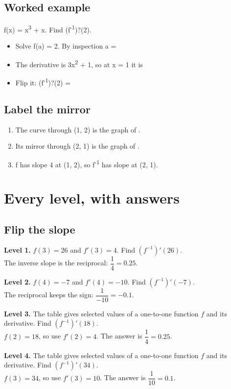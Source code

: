 \documentclass[11pt]{article}
\begin{document}
\subsection*{Worked example}
f(x) = x\textsuperscript{3} + x. Find (f\textsuperscript{-1})?(2).\\
\begin{itemize}
\item Solve f(a) = 2. By inspection a = 
\item The derivative is 3x\textsuperscript{2} + 1, so at x = 1 it is 
\item Flip it: (f\textsuperscript{-1})?(2) = 
\end{itemize}
\subsection*{Label the mirror}
\begin{enumerate}
\item The curve through (1, 2) is the graph of .
\item Its mirror through (2, 1) is the graph of .
\item f has slope 4 at (1, 2), so f\textsuperscript{-1} has slope  at (2, 1).
\end{enumerate}
\section*{Every level, with answers}
\subsection*{Flip the slope}
\noindent\textbf{Level 1.} $f(3)=26$ and $f'(3)=4$. Find $(f^{-1})'(26)$.\\  \quad The inverse slope is the reciprocal: $\dfrac1{4}=0.25$.\par\medskip
\noindent\textbf{Level 2.} $f(4)=-7$ and $f'(4)=-10$. Find $(f^{-1})'(-7)$.\\  \quad The reciprocal keeps the sign: $\dfrac1{-10}=-0.1$.\par\medskip
\noindent\textbf{Level 3.} The table gives selected values of a one-to-one function $f$ and its derivative. Find $(f^{-1})'(18)$.\\  \quad $f(2)=18$, so use $f'(2)=4$. The answer is $\dfrac1{4}=0.25$.\par\medskip
\noindent\textbf{Level 4.} The table gives selected values of a one-to-one function $f$ and its derivative. Find $(f^{-1})'(34)$.\\  \quad $f(3)=34$, so use $f'(3)=10$. The answer is $\dfrac1{10}=0.1$.\par\medskip
\end{document}
